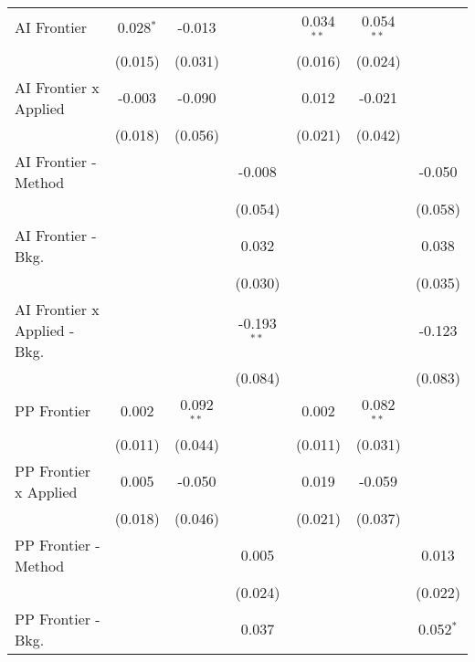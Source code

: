 \begin{tabular}{lcccccc}
   AI Frontier                    & 0.028$^{*}$  & -0.013       &               & 0.034$^{**}$ & 0.054$^{**}$ &   \\   
                                  & (0.015)      & (0.031)      &               & (0.016)      & (0.024)      &   \\   
   AI Frontier x Applied          & -0.003       & -0.090       &               & 0.012        & -0.021       &   \\   
                                  & (0.018)      & (0.056)      &               & (0.021)      & (0.042)      &   \\   
   AI Frontier - Method           &              &              & -0.008        &              &              & -0.050\\   
                                  &              &              & (0.054)       &              &              & (0.058)\\   
   AI Frontier - Bkg.             &              &              & 0.032         &              &              & 0.038\\   
                                  &              &              & (0.030)       &              &              & (0.035)\\   
   AI Frontier x Applied - Bkg.   &              &              & -0.193$^{**}$ &              &              & -0.123\\   
                                  &              &              & (0.084)       &              &              & (0.083)\\   
   PP Frontier                    & 0.002        & 0.092$^{**}$ &               & 0.002        & 0.082$^{**}$ &   \\   
                                  & (0.011)      & (0.044)      &               & (0.011)      & (0.031)      &   \\   
   PP Frontier x Applied          & 0.005        & -0.050       &               & 0.019        & -0.059       &   \\   
                                  & (0.018)      & (0.046)      &               & (0.021)      & (0.037)      &   \\   
   PP Frontier - Method           &              &              & 0.005         &              &              & 0.013\\   
                                  &              &              & (0.024)       &              &              & (0.022)\\   
   PP Frontier - Bkg.             &              &              & 0.037         &              &              & 0.052$^{*}$\\   

\end{tabular}
